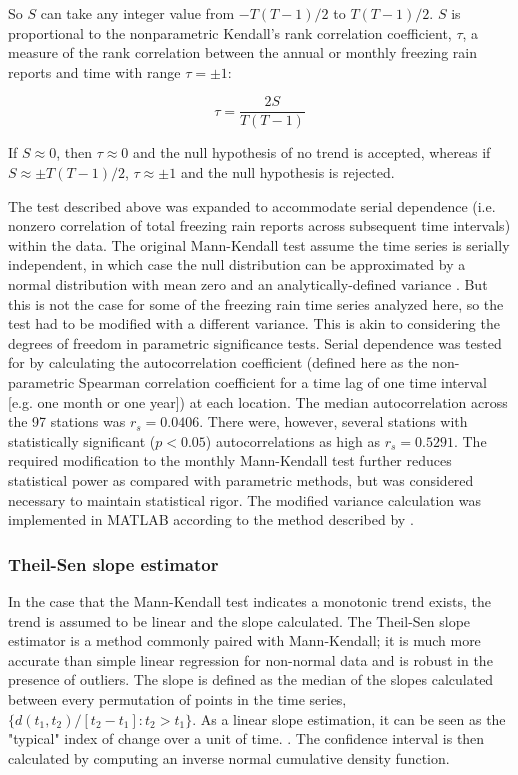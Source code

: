 \documentclass[twocol]{ametsoc}
\begin{document}
So $S$ can take any integer value from $-T(T-1)/2$ to $T(T-1)/2$. $S$ is proportional to the nonparametric Kendall's rank correlation coefficient, $\tau$, a measure of the rank correlation between the annual or monthly freezing rain reports and time with range $\tau=\pm1$:

\[\tau=\frac{2S}{T(T-1)}\]

If $S\approx0$, then $\tau\approx0$ and the null hypothesis of no trend is accepted, whereas if  $S\approx\pm T(T-1)/2$, $\tau\approx\pm1$ and the null hypothesis is rejected. 

The test described above was expanded to accommodate serial dependence (i.e. nonzero correlation of total freezing rain reports across subsequent time intervals) within the data. The original Mann-Kendall test assume the time series is serially independent, in which case the null distribution can be approximated by a normal distribution with mean zero and an analytically-defined variance \citep{kendall1955rank}. But this is not the case for some of the freezing rain time series analyzed here, so the test had to be modified with a different variance. This is akin to considering the degrees of freedom in parametric significance tests. Serial dependence was tested for by calculating the autocorrelation coefficient (defined here as the non-parametric Spearman correlation coefficient for a time lag of one time interval [e.g. one month or one year]) at each location. The median autocorrelation across the 97 stations was $r_s = 0.0406$. There were, however, several stations with statistically significant ($p<0.05$) autocorrelations as high as $r_s = 0.5291$. The required modification to the monthly Mann-Kendall test further reduces statistical power as compared with parametric methods, but was considered necessary to maintain statistical rigor. The modified variance calculation was implemented in MATLAB according to the method described by \citet{hirsch1984nonparametric}. 

\subsubsection{Theil-Sen slope estimator}
In the case that the Mann-Kendall test indicates a monotonic trend exists, the trend is assumed to be linear and the slope calculated. The Theil-Sen slope estimator is a method commonly paired with Mann-Kendall; it is much more accurate than simple linear regression for non-normal data and is robust in the presence of outliers. The slope is defined as the median of the slopes calculated between every permutation of points in the time series, $\{d(t_1,t_2)/[t_2-t_1]:t_2>t_1\}$. As a linear slope estimation, it can be seen as the "typical" index of change over a unit of time. \citep{chandler2011statistical}. The confidence interval is then calculated by computing an inverse normal cumulative density function.
\end{document}
